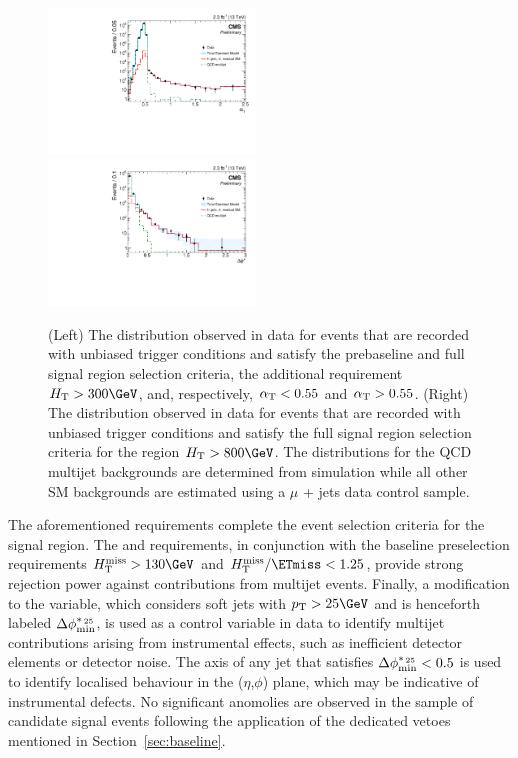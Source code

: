 \begin{figure}[tbhp]
  \begin{center}
    \includegraphics[width=0.49\textwidth]{figures/kine/v0/AlphaT_v6} \,
    \includegraphics[width=0.49\textwidth]{figures/kine/v0/bDPhi_v6} \\
  \end{center}
  \caption{(Left) The \alphat distribution observed in data for events
    that are recorded with unbiased trigger conditions and satisfy the
    prebaseline and full signal region selection criteria, the additional
    requirement $\scalht > 300\GeV$, and, respectively, $\alpha_{\text{T}} <
    0.55$ and $\alpha_{\text{T}} > 0.55$.  
    (Right) The \bdphi distribution observed in data for events
    that are recorded with unbiased trigger conditions and satisfy the
    full signal region selection criteria for the region $\scalht >
    800\GeV$. 
    The distributions for the QCD multijet backgrounds are determined
    from simulation while all other SM backgrounds are estimated using
    a $\mu$ + jets data control sample.
    \label{fig:alphat-bdphi} 
  }
\end{figure}

The aforementioned requirements complete the event selection criteria
for the signal region. The \alphat and \bdphi requirements, in
conjunction with the baseline preselection requirements $\HTmiss >
130\GeV$ and $\HTmiss / \ETmiss < 1.25$, provide strong rejection
power against contributions from multijet events. Finally, a
modification to the \bdphi variable, which considers soft jets with
$\Pt > 25\GeV$ and is henceforth labeled $\mbox{$\Delta\phi^{*_{\, 25}}_{\rm min}$}$, is used as a
control variable in data to identify multijet contributions arising
from instrumental effects, such as inefficient detector elements or
detector noise. The axis of any jet that satisfies $\mbox{$\Delta\phi^{*_{\, 25}}_{\rm min}$} < 0.5$
is used to identify localised behaviour in the ($\eta$,$\phi$) plane,
which may be indicative of instrumental defects. No significant
anomolies are observed in the sample of candidate signal events
following the application of the dedicated vetoes mentioned in
Section~\ref{sec:baseline}.

